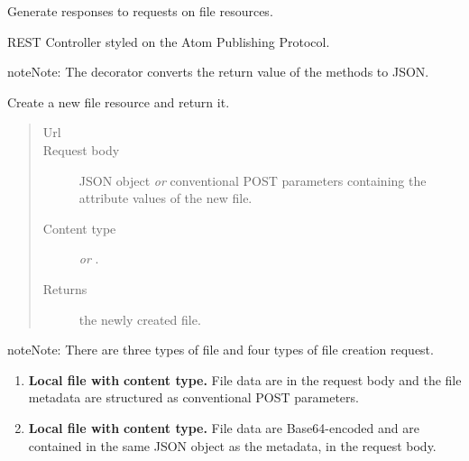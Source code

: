 \documentclass[letterpaper,10pt,english]{sphinxmanual}
\begin{document}
\begin{fulllineitems}
\label{api:onlinelinguisticdatabase.controllers.files.FilesController}
Generate responses to requests on file resources.

REST Controller styled on the Atom Publishing Protocol.

\begin{notice}{note}{Note:}
The  decorator converts the return value of the methods to
JSON.
\end{notice}

\begin{fulllineitems}
\label{api:onlinelinguisticdatabase.controllers.files.FilesController.create}
Create a new file resource and return it.
\begin{quote}\begin{description}
\item[{Url }] \leavevmode
{}

\item[{Request body}] \leavevmode
JSON object \emph{or} conventional POST parameters containing
the attribute values of the new file.

\item[{Content type}] \leavevmode
{} \emph{or} .

\item[{Returns}] \leavevmode
the newly created file.

\end{description}\end{quote}

\begin{notice}{note}{Note:}
There are three types of file and four types of file creation
request.
\begin{enumerate}
\item {} 
\textbf{Local file with}  \textbf{content type.}
File data are in the request body and the file metadata are
structured as conventional POST parameters.

\item {} 
\textbf{Local file with}  \textbf{content type.}
File data are Base64-encoded and are contained in the same JSON
object as the metadata, in the request body.


\end{enumerate}
\end{notice}
\end{fulllineitems}
\end{fulllineitems}
\end{document}
